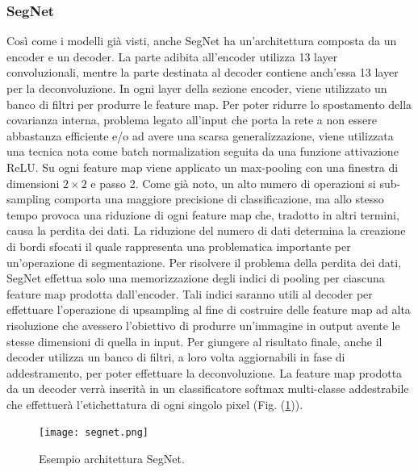 \subsubsection{SegNet}
Così come i modelli già visti, anche SegNet ha un'architettura composta da un 
encoder e un decoder. La parte adibita all'encoder utilizza 13 layer convoluzionali, 
mentre la parte destinata al decoder contiene anch'essa 13 layer per la deconvoluzione. 
In ogni layer della sezione encoder, viene utilizzato un banco di filtri 
per produrre le feature map. Per poter ridurre lo spostamento della covarianza 
interna, problema legato all'input che porta la rete a non essere abbastanza 
efficiente e/o ad avere una scarsa generalizzazione, viene utilizzata una tecnica 
nota come batch normalization \cite{batchNorm} seguita da una funzione attivazione ReLU. Su 
ogni feature map viene applicato un max-pooling con una finestra di dimensioni 
$2\times 2$ e passo 2. Come già noto, un alto numero di operazioni si sub-sampling 
comporta una maggiore precisione di classificazione, ma allo stesso tempo provoca 
una riduzione di ogni feature map che, tradotto in altri termini, causa la perdita 
dei dati. La riduzione del numero di dati determina la creazione di bordi sfocati 
il quale rappresenta una problematica importante per un'operazione di segmentazione. 
Per risolvere il problema della perdita dei dati, SegNet effettua solo una memorizzazione 
degli indici di pooling per ciascuna feature map prodotta dall'encoder. 
Tali indici saranno utili al decoder per effettuare l'operazione di upsampling 
al fine di costruire delle feature map ad alta risoluzione che avessero l'obiettivo di 
produrre un'immagine in output avente le stesse dimensioni di quella in input. 
Per giungere al risultato finale, anche il decoder utilizza un banco di filtri, a loro 
volta aggiornabili in fase di addestramento, per poter effettuare la deconvoluzione. 
La feature map prodotta da un decoder verrà inserità in un classificatore softmax 
multi-classe addestrabile che effettuerà l'etichettatura di ogni singolo pixel (Fig. (\ref{segnet})).
\begin{figure}
    \centering
    \texttt{[image: segnet.png]}
    \centering
    \caption{Esempio architettura SegNet.}
    \label{segnet}
\end{figure}

